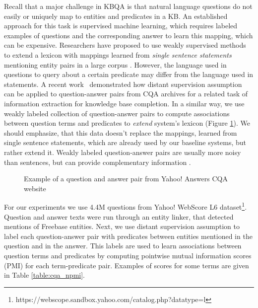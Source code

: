 Recall that a major challenge in KBQA is that natural language questions do not easily or uniquely map to entities and predicates in a KB.
An established approach for this task is supervised machine learning, which requires labeled examples of questions and the corresponding answer to learn this mapping, which can be expensive.
Researchers have proposed to use weakly supervised methods to extend a lexicon with mappings learned from \textit{single sentence statements} mentioning entity pairs in a large corpus \cite{yao2014information}.
However, the language used in questions to query about a certain predicate may differ from the language used in statements.
A recent work~\cite{savenkov-EtAl:2015:SRW} demonstrated how distant supervision assumption can be applied to question-answer pairs from CQA archives for a related task of information extraction for knowledge base completion.
In a similar way, we use weakly labeled collection of question-answer pairs to compute associations between question terms and predicates to \textit{extend} system's lexicon (Figure \ref{fig:cqa_example}).
We should emphasize, that this data doesn't replace the mappings, learned from single sentence statements, which are already used by our baseline systems, but rather extend it.
Weakly labeled question-answer pairs are usually more noisy than sentences, but can provide complementary information \cite{savenkov-EtAl:2015:SRW}.

\begin{figure}
\centering
{}
\caption{Example of a question and answer pair from Yahoo! Answers CQA website}
\label{fig:cqa_example}
\end{figure}

For our experiments we use 4.4M questions from Yahoo! WebScore L6 dataset\footnote{https://webscope.sandbox.yahoo.com/catalog.php?datatype=l}.
Question and answer texts were run through an entity linker, that detected mentions of Freebase entities.
Next, we use distant supervision assumption to label each question-answer pair with predicates between entities mentioned in the question and in the answer.
This labels are used to learn associations between question terms and predicates by computing pointwise mutual information scores (PMI) for each term-predicate pair.
Examples of scores for some terms are given in Table \ref{table:cqa_npmi}.

